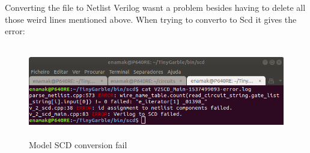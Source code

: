 \begin{refsection}
Converting the file to Netlist Verilog wasnt a problem besides having to delete all those weird lines mentioned above.
When trying to converto to Scd it gives the error:

\begin{figure}[H]
	\centering
	\includegraphics[width=1\textwidth, height=4cm]{./sdf/secure_multiparty_computation/figures/tinygarble_moda_scd_fail.png}
    \caption{Model SCD conversion fail}\label{fig:moda_scd_fail}
\end{figure}


\clearpage
\printbibliography[heading=subbibliography]
\end{refsection}
\cleardoublepage
